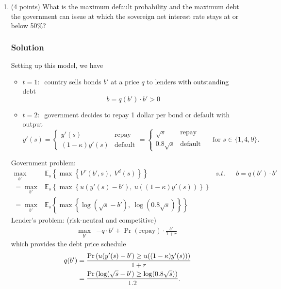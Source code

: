 \documentclass[12pt]{article}
\begin{document}
\begin{enumerate}
    \begin{enumerate}[label=(\alph*)]
        \item (4 points) What is the maximum default probability and the maximum debt the government can issue at which the sovereign net interest rate stays at or below 50\%?
        \subsubsection*{Solution}

        Setting up this model, we have 
        \begin{itemize}
            \item $t=1: \ $ country sells bonds $b'$ at a price $q$ to lenders with outstanding debt 
            \[ b = q(b') \cdot b' > 0\]
            \item $t=2: \ $ government decides to repay 1 dollar per bond or default with output 
            \[ y'(s) = \begin{cases}
                y'(s) & \text{repay}
                \\ (1-\kappa)y'(s) & \text{default}
            \end{cases} = \begin{cases}
                \sqrt{s} & \text{repay}
                \\ 0.8\sqrt{s}  & \text{default}
            \end{cases} \quad  \text{ for } s \in \{1, 4, 9\}.
            \]
        \end{itemize}
        Government problem: 
        \begin{align*}
            \max_{b'}& \mathbb{E}_s \left\{ \max \left\{ V^r(b',s) , \ V^d(s)  \right\}  \right\} & s.t. &  &b=q(b')\cdot b' 
            \\ =\max_{b'}& \mathbb{E}_s \left\{ \max \left\{u(y'(s) - b') , \ u((1-\kappa)y'(s))  \right\}  \right\}
            \\ =\max_{b'}& \mathbb{E}_s \left\{ \max \left\{\log(\sqrt{s} - b') , \ \log(0.8\sqrt{s})  \right\}  \right\}
        \end{align*}
        Lender's problem: (risk-neutral and competitive)
        \begin{align*}
            \max_{b'}& -q\cdot b' + \Pr(\text{repay}) \cdot \frac{b'}{1+r}
        \end{align*}
        which provides the debt price schedule 
        \begin{align}
            q(b') &= \frac{\Pr\left( u(y'(s) - b') \geq u((1-\kappa)y'(s)) \right)}{1+r}\notag 
            \\ &= \frac{\Pr\left( \log(\sqrt{s} - b') \geq \log(0.8\sqrt{s})   \right)}{1.2}. \label{2a}
        \end{align}


\end{enumerate}
\end{enumerate}
\end{document}
